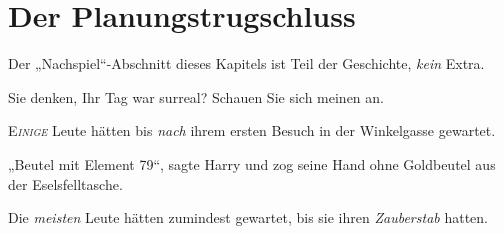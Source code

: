 \chapter{Der Planungstrugschluss}

\begin{chapterOpeningAuthorNote}
% 
Der „Nachspiel“-Abschnitt dieses Kapitels ist Teil der Geschichte, \emph{kein} Extra.
\end{chapterOpeningAuthorNote}
\begin{chapterOpeningQuote}
Sie denken, Ihr Tag war surreal? Schauen Sie sich meinen an.
\end{chapterOpeningQuote}

\lettrine{E}{\emph{inige}} Leute hätten bis \emph{nach} ihrem ersten Besuch in der Winkelgasse gewartet.

„Beutel mit Element 79“, sagte Harry und zog seine Hand ohne Goldbeutel aus der Eselsfelltasche.

Die \emph{meisten} Leute hätten zumindest gewartet, bis sie ihren \emph{Zauberstab} hatten.

